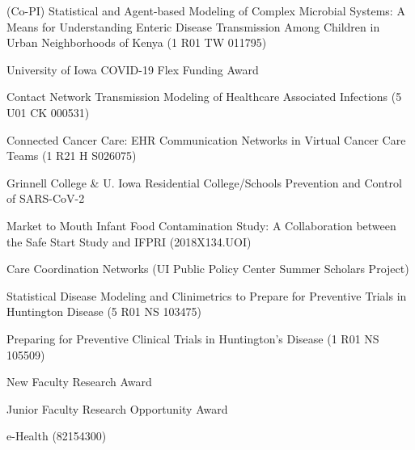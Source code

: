 \documentclass[11pt]{article}
\begin{document}
\begin{description}
\setlength\itemsep{0pc}
\item (Co-PI) Statistical and Agent-based Modeling of Complex Microbial Systems:  A Means for Understanding Enteric Disease Transmission Among Children in Urban Neighborhoods of Kenya (1 R01 TW 011795)
\item University of Iowa COVID-19 Flex Funding Award
\item Contact Network Transmission Modeling of Healthcare Associated Infections (5 U01 CK 000531)
\item Connected Cancer Care: EHR Communication Networks in Virtual Cancer Care Teams (1 R21 H S026075)
\item Grinnell College \& U. Iowa Residential College/Schools Prevention and Control of SARS-CoV-2
\item Market to Mouth Infant Food Contamination Study: A Collaboration between the Safe Start Study and IFPRI (2018X134.UOI)
\item Care Coordination Networks (UI Public Policy Center Summer Scholars Project)
\item Statistical Disease Modeling and Clinimetrics to Prepare for Preventive Trials in Huntington Disease (5 R01 NS 103475)
\item Preparing for Preventive Clinical Trials in Huntington's Disease (1 R01 NS 105509)
\item New Faculty Research Award
\item Junior Faculty Research Opportunity Award
\item e-Health (82154300)
\end{description}
\end{document}
